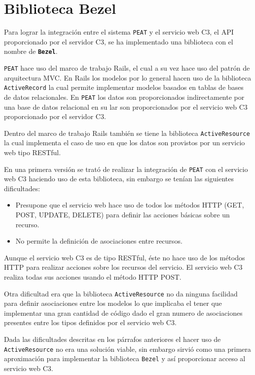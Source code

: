 \section{Biblioteca Bezel}

Para lograr la integración entre el sistema \texttt{PEAT} y el servicio web C3,
el API proporcionado por el servidor C3, se ha implementado una biblioteca
con el nombre de \textbf{\texttt{Bezel}}.

\texttt{PEAT} hace uso del marco de trabajo Rails, el cual a su vez hace
uso del patrón de arquitectura MVC. En Rails los modelos por lo general hacen uso
de la biblioteca \texttt{ActiveRecord} la cual permite implementar modelos basados
en tablas de bases de datos relacionales. En \texttt{PEAT} los datos
son proporcionados indirectamente por una base de datos relacional en su lar son
proporcionados por el servicio web C3 proporcionado por el servidor C3.

Dentro del marco de trabajo Rails también se tiene la biblioteca
\texttt{ActiveResource} la cual implementa el caso de uso en que los datos son
provistos por un servicio web tipo RESTful.

En una primera versión se trató de realizar la integración de \texttt{PEAT} con el
servicio web C3 haciendo uso de esta biblioteca, sin embargo se tenían las siguientes
dificultades:

\begin{itemize}
\item Presupone que el servicio web hace uso de todos los métodos HTTP (GET, POST,
  UPDATE, DELETE) para definir las acciones básicas sobre un recurso.
\item No permite la definición de asociaciones entre recursos.
\end{itemize}

Aunque el servicio web C3 es de tipo RESTful, éste no hace uso de los métodos
HTTP para realizar acciones sobre los recursos del servicio. El servicio web
C3 realiza todas sus acciones usando el método HTTP POST.

Otra dificultad era que la biblioteca \texttt{ActiveResource} no da ninguna facilidad
para definir asociaciones entre los modelos lo que implicaba el tener que implementar
una gran cantidad de código dado el gran numero de asociaciones presentes entre los
tipos definidos por el servicio web C3.

Dada las dificultades descritas en los párrafos anteriores el hacer uso de
\texttt{ActiveResource} no era una solución viable, sin embargo sirvió como una
primera aproximación para implementar la biblioteca \texttt{Bezel} y así
proporcionar acceso al servicio web C3.

